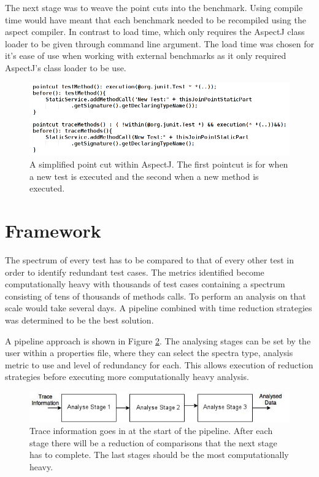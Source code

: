 The next stage was to weave the point cuts into the benchmark. Using compile time would have meant that each benchmark needed to be recompiled using the aspect compiler. In contrast to load time, which only requires the AspectJ class loader to be given through command line argument. The load time was chosen for it's ease of use when working with external benchmarks as it only required AspectJ's class loader to be use.

\begin{figure}[h]
\begin{center}
\includegraphics[width = \textwidth]{aspect.png}
\end{center}
\caption{A simplified point cut within AspectJ. The first pointcut is for when a new test is executed and the second when a new method is executed.}
\label{fig:aspectused}
\end{figure}

\section{Framework}
\label{S:framework}

The spectrum of every test has to be compared to that of every other test in order to identify redundant test cases. The metrics identified become computationally heavy with thousands of test cases containing a spectrum consisting of tens of thousands of methods calls. To perform an analysis on that scale would take several days. A pipeline combined with time reduction strategies was determined to be the best solution.

A pipeline approach is shown in Figure \ref{fig:pipeline}. The analysing stages can be set by the user within a properties file, where they can select the spectra type, analysis metric to use and level of redundancy for each. This allows execution of reduction strategies before executing more computationally heavy analysis.

\begin{figure}[h]
\includegraphics[width=\textwidth]{Pipeline.jpg}
\caption{Trace information goes in at the start of the pipeline. After each stage there will be a reduction of comparisons that the next stage has to complete. The last stages should be the most computationally heavy.}
\label{fig:pipeline}
\end{figure}

